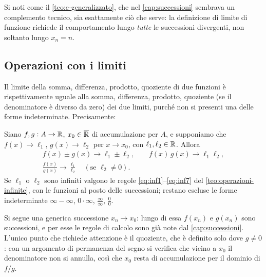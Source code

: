Si noti come il \cref{teo:e-generalizzato}, che nel \cref{cap:successioni} sembrava un
complemento tecnico, sia esattamente ciò che serve: la definizione di limite di funzione
richiede il comportamento lungo \emph{tutte} le successioni divergenti, non soltanto
lungo $x_{n}=n$.

\subsection{Operazioni con i limiti}

Il limite della somma, differenza, prodotto, quoziente di due funzioni è
rispettivamente uguale alla somma, differenza, prodotto, quoziente (se il denominatore è
diverso da zero) dei due limiti, purché non si presenti una delle forme indeterminate.
Precisamente:

\begin{teorema}\label{teo:operazioni-funzioni}
Siano $f,g:A\to\mathbb{R}$, $x_{0}\in\overline{\mathbb{R}}$ di accumulazione per $A$, e supponiamo che
$f(x)\to\ell_{1}$, $g(x)\to\ell_{2}$ per $x\to x_{0}$, con $\ell_{1},\ell_{2}\in\mathbb{R}$. Allora
\begin{equation}\label{eq:operazioni-funzioni}
\begin{gathered}
  f(x)\pm g(x)\to\ell_{1}\pm\ell_{2}, \qquad f(x)\,g(x)\to\ell_{1}\ell_{2},\\
  \frac{f(x)}{g(x)}\to\frac{\ell_{1}}{\ell_{2}} \quad(\text{se } \ell_{2}\neq0).
\end{gathered}
\end{equation}
Se $\ell_{1}$ o $\ell_{2}$ sono infiniti valgono le regole \eqref{eq:inf1}--\eqref{eq:inf7}
del \cref{teo:operazioni-infinite}, con le funzioni al posto delle successioni; restano
escluse le forme indeterminate $\infty-\infty$, $0\cdot\infty$, $\frac\infty\infty$,
$\frac00$.
\end{teorema}

\begin{schema}
\end{schema}

\begin{strategia}
Si segue una generica successione $x_{n}\to x_{0}$: lungo di essa $f(x_{n})$ e
$g(x_{n})$ sono successioni, e per esse le regole di calcolo sono già note dal
\cref{cap:successioni}. L'unico punto che richiede attenzione è il quoziente, che è
definito solo dove $g\neq0$: con un argomento di permanenza del segno si verifica che vicino a
$x_{0}$ il denominatore non si annulla, così che $x_{0}$ resta di accumulazione per il
dominio di $f/g$.
\end{strategia}

